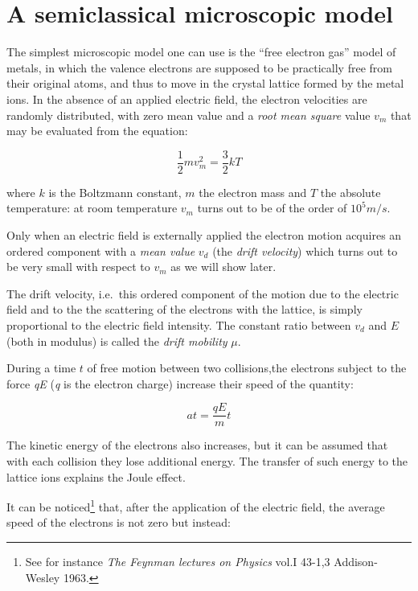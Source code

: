 \documentclass[]{book}
\let\rmarkdownfootnote\footnote%
\def\footnote{\protect\rmarkdownfootnote}
\begin{document}
\chapter{A semiclassical microscopic
model}\label{a-semiclassical-microscopic-model}

The simplest microscopic model one can use is the ``free electron gas''
model of metals, in which the valence electrons are supposed to be
practically free from their original atoms, and thus to move in the
crystal lattice formed by the metal ions. In the absence of an applied
electric field, the electron velocities are randomly distributed, with
zero mean value and a \emph{root mean square} value \(v_{m}\) that may
be evaluated from the equation:

\begin{equation}
\frac{1}{2}mv_{m}^2=\frac{3}{2}kT
\label{eq:electronVrms}
\end{equation}

where \(k\) is the Boltzmann constant, \(m\) the electron mass and \(T\)
the absolute temperature: at room temperature \(v_{m}\) turns out to be
of the order of \(10^5 m/s\).

Only when an electric field is externally applied the electron motion
acquires an ordered component with a \emph{mean value} \(v_d\) (the
\emph{drift velocity}) which turns out to be very small with respect to
\(v_{m}\) as we will show later.

The drift velocity, i.e.~this ordered component of the motion due to the
electric field and to the the scattering of the electrons with the
lattice, is simply proportional to the electric field intensity. The
constant ratio between \(v_d\) and \(E\) (both in modulus) is called the
\emph{drift mobility} \(\mu\).

During a time \(t\) of free motion between two collisions,the electrons
subject to the force \emph{qE} (\emph{q} is the electron charge)
increase their speed of the quantity:

\begin{equation}
a t = \frac{qE}{m}t
\label{eq:electronsDelta}
\end{equation}

The kinetic energy of the electrons also increases, but it can be
assumed that with each collision they lose additional energy. The
transfer of such energy to the lattice ions explains the Joule effect.

It can be noticed\footnote{See for instance \emph{The Feynman lectures
  on Physics} vol.I 43-1,3 Addison-Wesley 1963.} that, after the
application of the electric field, the average speed of the electrons is
not zero but instead:
\end{document}
